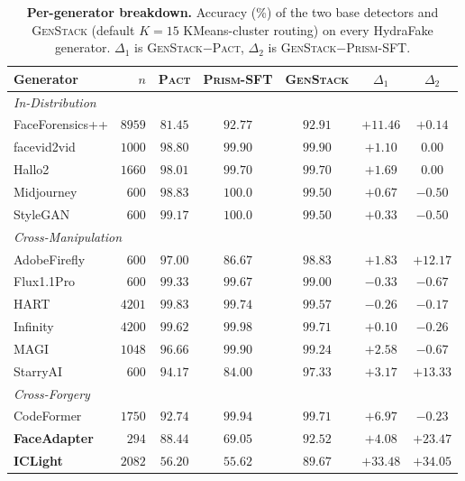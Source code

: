 \documentclass[10pt,twocolumn,letterpaper]{article}
\newcommand{\vfive}{\textsc{Pact}}
\newcommand{\prism}{\textsc{Prism-SFT}}
\begin{document}
\begin{table}[t]
\centering
\scriptsize
\setlength{\tabcolsep}{2pt}
\caption{\textbf{Per-generator breakdown.} Accuracy (\%) of the two base detectors and \textsc{GenStack} (default $K{=}15$ KMeans-cluster routing) on every HydraFake generator. $\Delta_1$ is \textsc{GenStack}$-$\vfive, $\Delta_2$ is \textsc{GenStack}$-$\prism.}
\label{tab:per_gen_new}
\begin{tabular}{l r c c c c c}
\toprule
Generator & $n$ & \vfive & \prism & \textbf{\textsc{GenStack}} & $\Delta_1$ & $\Delta_2$ \\
\midrule
\multicolumn{7}{l}{\emph{In-Distribution}} \\
FaceForensics++ & $8959$ & $81.45$ & $92.77$ & $\mathbf{92.91}$ & $+11.46$ & $+0.14$ \\
facevid2vid     & $1000$ & $98.80$ & $99.90$ & $99.90$          & $+1.10$  & $0.00$ \\
Hallo2          & $1660$ & $98.01$ & $99.70$ & $99.70$          & $+1.69$  & $0.00$ \\
Midjourney      & $600$  & $98.83$ & $100.0$ & $99.50$          & $+0.67$  & $-0.50$ \\
StyleGAN        & $600$  & $99.17$ & $100.0$ & $99.50$          & $+0.33$  & $-0.50$ \\
\midrule
\multicolumn{7}{l}{\emph{Cross-Manipulation}} \\
AdobeFirefly & $600$  & $97.00$ & $86.67$ & $\mathbf{98.83}$ & $+1.83$  & $+12.17$ \\
Flux1.1Pro   & $600$  & $99.33$ & $99.67$ & $99.00$          & $-0.33$  & $-0.67$ \\
HART         & $4201$ & $99.83$ & $99.74$ & $99.57$          & $-0.26$  & $-0.17$ \\
Infinity     & $4200$ & $99.62$ & $99.98$ & $99.71$          & $+0.10$  & $-0.26$ \\
MAGI         & $1048$ & $96.66$ & $99.90$ & $99.24$          & $+2.58$  & $-0.67$ \\
StarryAI     & $600$  & $94.17$ & $84.00$ & $\mathbf{97.33}$ & $+3.17$  & $+13.33$ \\
\midrule
\multicolumn{7}{l}{\emph{Cross-Forgery}} \\
CodeFormer       & $1750$ & $92.74$ & $99.94$ & $99.71$         & $+6.97$  & $-0.23$ \\
\textbf{FaceAdapter}      & $294$  & $88.44$ & $69.05$ & $\mathbf{92.52}$ & $+4.08$  & $+23.47$ \\
\textbf{ICLight} & $2082$ & $56.20$ & $55.62$ & $\mathbf{89.67}$ & $\mathbf{+33.48}$ & $\mathbf{+34.05}$ \\

\end{tabular}
\end{table}
\end{document}
